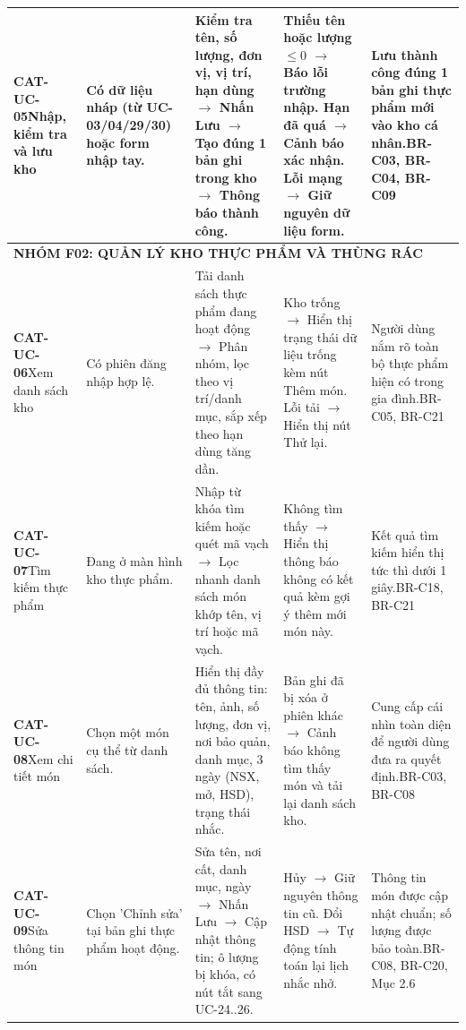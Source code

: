 \documentclass[10pt,a4paper]{article}
\begin{document}
\begin{longtable}{|p{2.1cm}|p{2.3cm}|p{3.5cm}|p{3.8cm}|p{3.0cm}|}
\hline
\textbf{CAT-UC-05}\newline Nhập, kiểm tra và lưu kho & Có dữ liệu nháp (từ UC-03/04/29/30) hoặc form nhập tay. & Kiểm tra tên, số lượng, đơn vị, vị trí, hạn dùng $\to$ Nhấn Lưu $\to$ Tạo đúng 1 bản ghi trong kho $\to$ Thông báo thành công. & Thiếu tên hoặc lượng $\le 0$ $\to$ Báo lỗi trường nhập. Hạn đã quá $\to$ Cảnh báo xác nhận. Lỗi mạng $\to$ Giữ nguyên dữ liệu form. & Lưu thành công đúng 1 bản ghi thực phẩm mới vào kho cá nhân.\newline BR-C03, BR-C04, BR-C09 \\
\hline

\multicolumn{5}{|l|}{\textbf{\color{primary}NHÓM F02: QUẢN LÝ KHO THỰC PHẨM VÀ THÙNG RÁC}} \\
\hline
\textbf{CAT-UC-06}\newline Xem danh sách kho & Có phiên đăng nhập hợp lệ. & Tải danh sách thực phẩm đang hoạt động $\to$ Phân nhóm, lọc theo vị trí/danh mục, sắp xếp theo hạn dùng tăng dần. & Kho trống $\to$ Hiển thị trạng thái dữ liệu trống kèm nút Thêm món. Lỗi tải $\to$ Hiển thị nút Thử lại. & Người dùng nắm rõ toàn bộ thực phẩm hiện có trong gia đình.\newline BR-C05, BR-C21 \\
\hline
\textbf{CAT-UC-07}\newline Tìm kiếm thực phẩm & Đang ở màn hình kho thực phẩm. & Nhập từ khóa tìm kiếm hoặc quét mã vạch $\to$ Lọc nhanh danh sách món khớp tên, vị trí hoặc mã vạch. & Không tìm thấy $\to$ Hiển thị thông báo không có kết quả kèm gợi ý thêm mới món này. & Kết quả tìm kiếm hiển thị tức thì dưới 1 giây.\newline BR-C18, BR-C21 \\
\hline
\textbf{CAT-UC-08}\newline Xem chi tiết món & Chọn một món cụ thể từ danh sách. & Hiển thị đầy đủ thông tin: tên, ảnh, số lượng, đơn vị, nơi bảo quản, danh mục, 3 ngày (NSX, mở, HSD), trạng thái nhắc. & Bản ghi đã bị xóa ở phiên khác $\to$ Cảnh báo không tìm thấy món và tải lại danh sách kho. & Cung cấp cái nhìn toàn diện để người dùng đưa ra quyết định.\newline BR-C03, BR-C08 \\
\hline
\textbf{CAT-UC-09}\newline Sửa thông tin món & Chọn 'Chỉnh sửa' tại bản ghi thực phẩm hoạt động. & Sửa tên, nơi cất, danh mục, ngày $\to$ Nhấn Lưu $\to$ Cập nhật thông tin; ô lượng bị khóa, có nút tắt sang UC-24..26. & Hủy $\to$ Giữ nguyên thông tin cũ. Đổi HSD $\to$ Tự động tính toán lại lịch nhắc nhở. & Thông tin món được cập nhật chuẩn; số lượng được bảo toàn.\newline BR-C08, BR-C20, Mục 2.6 \\

\end{longtable}
\end{document}
